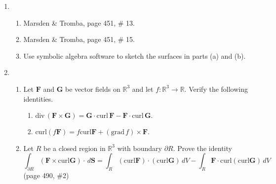 \documentclass{article}
\newcommand{\divt}{\text{div} \,}
\begin{document}
\begin{enumerate}
    \newpage
    \item 
    \begin{enumerate}
        \item Marsden \& Tromba, page 451, \# 13.
        \item Marsden \& Tromba, page 451, \# 15.
        \item Use symbolic algebra software to sketch the surfaces in parts (a) and (b).
    \end{enumerate}
    
    \newpage
    \item 
    \begin{enumerate}
        \item Let $\boldsymbol F$ and $\boldsymbol G$ be vector fields on $\mathbb{R}^3$ and let $f : \mathbb{R}^3 \rightarrow \mathbb{R}$. Verify the following identities.
        \begin{enumerate}[label=(\roman*)]
            \item $\divt (\boldsymbol F \times \boldsymbol G) = \boldsymbol G \cdot \text{curl} \, \boldsymbol F - \boldsymbol F \cdot \text{curl} \, \boldsymbol G.$
            \item curl$(f \boldsymbol F) = f \text{curl} \boldsymbol F + (\text{grad}\, f) \times \boldsymbol F$.
        \end{enumerate}
        \item Let $R$ be a closed region in $\mathbb{R}^3$ with boundary $\partial R$. Prove the identity
        \[\int_{\partial R} ( \boldsymbol F \times \text{curl} \boldsymbol G) \cdot \, d \boldsymbol S = \int_R(\text{curl} \boldsymbol F ) \cdot (\text{curl} \boldsymbol G) \, dV - \int_R \boldsymbol F \cdot \text{curl}(\text{curl} \boldsymbol G ) \, dV\]
        (page 490, \#2)
    \end{enumerate}
\end{enumerate}
\end{document}
